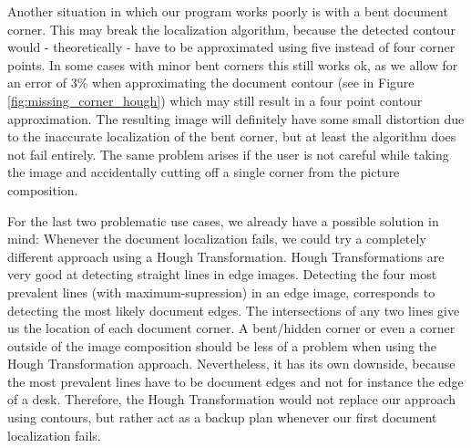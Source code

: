 \documentclass[bibliography=totoc]{scrartcl}
\begin{document}
Another situation in which our program works poorly is with a bent document corner.
This may break the localization algorithm, because the detected contour would - theoretically - have to be approximated using five instead of four corner points.
In some cases with minor bent corners this still works ok, as we allow for an error of 3\% when approximating the document contour (see in Figure  \ref{fig:missing_corner_hough}) which may still result in a four point contour approximation.
The resulting image will definitely have some small distortion due to the inaccurate localization of the bent corner, but at least the algorithm does not fail entirely.
The same problem arises if the user is not careful while taking the image and accidentally cutting off a single corner from the picture composition.

For the last two problematic use cases, we already have a possible solution in mind:
Whenever the document localization fails, we could try a completely different approach using a Hough Transformation.
Hough Transformations are very good at detecting straight lines in edge images.
Detecting the four most prevalent lines (with maximum-supression) in an edge image, corresponds to detecting the most likely document edges.
The intersections of any two lines give us the location of each document corner.
A bent/hidden corner or even a corner outside of the image composition should be less of a problem when using the Hough Transformation approach.
Nevertheless, it has its own downside, because the most prevalent lines have to be document edges and not for instance the edge of a desk.
Therefore, the Hough Transformation would not replace our approach using contours, but rather act as a backup plan whenever our first document localization fails.\\
\end{document}
